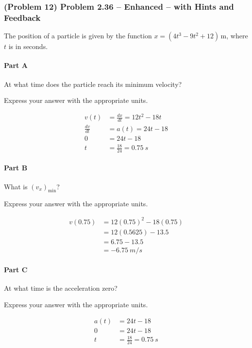 \newpage

\subsubsection{(Problem 12) Problem 2.36 -- Enhanced -- with Hints and Feedback}

The position of a particle is given by the function $x = (4t^3 - 9t^2 + 12) \, \mathrm{m}$, where \( t \) is in seconds.

\paragraph{Part A}
At what time does the particle reach its minimum velocity?

Express your answer with the appropriate units.

\begin{solution}
	\begin{align*}
		v(t) &= \frac{dx}{dt} = 12t^2 - 18t \\
		\frac{dv}{dt} &= a(t) = 24t - 18 \\
		0 &= 24t - 18 \\
		t &= \frac{18}{24} = \SI{0.75}{s}
	\end{align*}
\end{solution}

\paragraph{Part B}
What is \( (v_x)_{\mathrm{min}} \)?

Express your answer with the appropriate units.

\begin{solution}
	\begin{align*}
		v(0.75) &= 12(0.75)^2 - 18(0.75) \\
		&= 12(0.5625) - 13.5 \\
		&= 6.75 - 13.5 \\
		&= \SI{-6.75}{m/s}
	\end{align*}
\end{solution}

\paragraph{Part C}
At what time is the acceleration zero?

Express your answer with the appropriate units.

\begin{solution}
	\begin{align*}
		a(t) &= 24t - 18 \\
		0 &= 24t - 18 \\
		t &= \frac{18}{24} = \SI{0.75}{s}
	\end{align*}
\end{solution}

